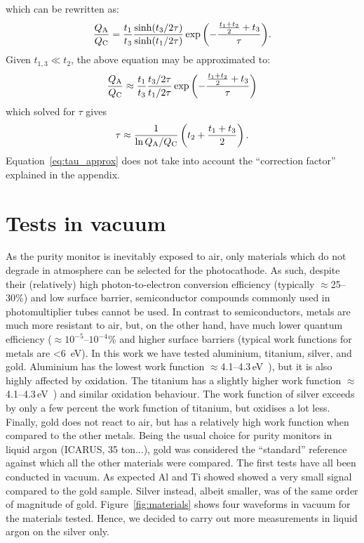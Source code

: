\documentclass[a4paper,11pt]{article}
\begin{document}
which can be rewritten as:
\begin{equation}
    \frac{Q_{\rm A}}{Q_{\rm C}} = \frac{t_1}{t_3} 
    \frac{\sinh(t_3/2\tau)}{\sinh(t_1/2\tau)}
    \exp{\left(-\frac{\frac{t_1+t_2}{2}+t_3}{\tau}\right)}.
    \label{eq:sinh}
\end{equation}
Given $t_{1,3} \ll t_2$, the above equation may be approximated to:
\begin{equation}
    \frac{Q_{\rm A}}{Q_{\rm C}} \approx \frac{t_1}{t_3} 
    \frac{t_3/2\tau}{t_1/2\tau}
    \exp{\left(-\frac{\frac{t_1+t_2}{2}+t_3}{\tau}\right)}
\end{equation}
 which solved for $\tau$ gives
\begin{equation}
    \tau \approx \frac{1}{\ln{Q_{\rm A}/Q_{\rm C}}}\left ( t_2 + \frac{t_1+t_3}{2}\right).
    \label{eq:tau_approx}
\end{equation}
Equation~\ref{eq:tau_approx} does not take into account the ``correction factor'' explained in the appendix. 

\section{Tests in vacuum}
As the purity monitor is inevitably exposed to air, only materials which do not degrade in atmosphere can be selected for the photocathode. As such, despite their (relatively) high photon-to-electron conversion efficiency (typically $\approx$25--30\%) and low surface barrier, semiconductor compounds commonly used in photomultiplier tubes cannot be used. In contrast to semiconductors, metals are much more resistant to air, but, on the other hand, have much lower quantum efficiency ($\approx$$10^{-5}$--$10^{-4}$\% and higher surface barriers (typical work functions for metals are \SI{<6}{eV}). In this work we have tested aluminium, titanium, silver, and gold. Aluminium has the lowest work function $\approx$4.1--4.3\,eV~\cite{}), but it is also highly affected by oxidation. The titanium has a slightly higher work function $\approx$4.1--4.3\,eV~\cite{}) and similar oxidation behaviour. The work function of silver exceeds by only a few percent the work function of titanium, but oxidises a lot less. Finally, gold does not react to air, but has a relatively high work function when compared to the other metals.
Being the usual choice for purity monitors in liquid argon (ICARUS, 35 ton...), gold was considered the ``standard'' reference against which all the other materials were compared. 
The first tests have all been conducted in vacuum. As expected Al and Ti showed showed a very small signal compared to the gold sample. Silver instead, albeit smaller, was of the same order of magnitude of gold.  Figure~\ref{fig:materials} shows four waveforms in vacuum for the materials tested. 
Hence, we decided to carry out more measurements in liquid argon on the silver only.
\end{document}
